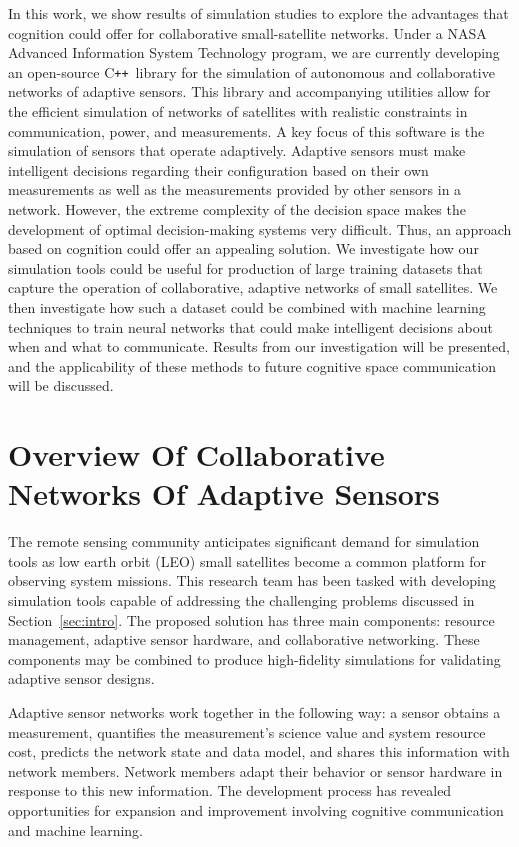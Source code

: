 \documentclass[conference]{IEEEtran}
\newcommand{\cpp}{C\texttt{++}~}
\begin{document}
In this work, we show results of simulation studies to explore the advantages
that cognition could offer for collaborative small-satellite networks.  Under a
NASA Advanced Information System Technology program, we are currently developing
an open-source \cpp library for the simulation of autonomous and collaborative
networks of adaptive sensors.  This library and accompanying utilities allow for
the efficient simulation of networks of satellites with realistic constraints in
communication, power, and measurements.  A key focus of this software is the
simulation of sensors that operate adaptively.  Adaptive sensors must make
intelligent decisions regarding their configuration based on their own
measurements as well as the measurements provided by other sensors in a network.
However, the extreme complexity of the decision space makes the development of
optimal decision-making systems very difficult.  Thus, an approach based on
cognition could offer an appealing solution.  We investigate how our simulation
tools could be useful for production of large training datasets that capture the
operation of collaborative, adaptive networks of small satellites.  We then
investigate how such a dataset could be combined with machine learning
techniques to train neural networks that could make intelligent decisions about
when and what to communicate.  Results from our investigation will be presented,
and the applicability of these methods to future cognitive space communication
will be discussed.


\section{Overview Of Collaborative Networks Of Adaptive Sensors}
\label{sec:overview}

The remote sensing community anticipates significant demand for simulation tools
as low earth orbit (LEO) small satellites become a common platform for observing
system missions.  This research team has been tasked with developing simulation
tools capable of addressing the challenging problems discussed in
Section~\ref{sec:intro}.  The proposed solution has three main components:
resource management, adaptive sensor hardware, and collaborative networking.
These components may be combined to produce high-fidelity simulations for
validating adaptive sensor designs.

Adaptive sensor networks work together in the following way: a sensor obtains a
measurement, quantifies the measurement's science value and system resource
cost, predicts the network state and data model, and shares this information
with network members.  Network members adapt their behavior or sensor hardware
in response to this new information.  The development process has revealed
opportunities for expansion and improvement involving cognitive communication
and machine learning.
\end{document}
